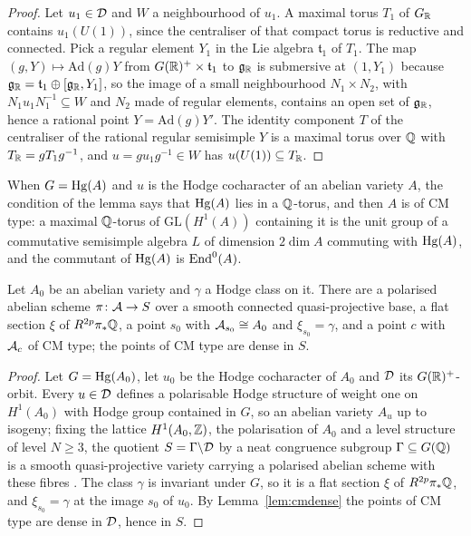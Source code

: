 \begin{proof}
Let $u_{1}\in\mathcal{D}$ and $W$ a neighbourhood of $u_{1}$. A maximal torus $T_{1}$ of $G_{\mathbb{R}}$ contains $u_{1}(U(1))$, since the centraliser of that compact torus is reductive and connected. Pick a regular element $Y_{1}$ in the Lie algebra $\mathfrak{t}_{1}$ of $T_{1}$. The map $(g,Y)\mapsto\mathrm{Ad}(g)Y$ from $G(\mathbb{R})^{+}\times\mathfrak{t}_{1}$ to $\mathfrak{g}_{\mathbb{R}}$ is submersive at $(1,Y_{1})$ because $\mathfrak{g}_{\mathbb{R}}=\mathfrak{t}_{1}\oplus[\mathfrak{g}_{\mathbb{R}},Y_{1}]$, so the image of a small neighbourhood $N_{1}\times N_{2}$, with $N_{1}u_{1}N_{1}^{-1}\subseteq W$ and $N_{2}$ made of regular elements, contains an open set of $\mathfrak{g}_{\mathbb{R}}$, hence a rational point $Y=\mathrm{Ad}(g)Y'$. The identity component $T$ of the centraliser of the rational regular semisimple $Y$ is a maximal torus over $\mathbb{Q}$ with $T_{\mathbb{R}}=gT_{1}g^{-1}$, and $u=gu_{1}g^{-1}\in W$ has $u(U(1))\subseteq T_{\mathbb{R}}$.
\end{proof}

When $G=\mathrm{Hg}(A)$ and $u$ is the Hodge cocharacter of an abelian variety $A$, the condition of the lemma says that $\mathrm{Hg}(A)$ lies in a $\mathbb{Q}$-torus, and then $A$ is of CM type: a maximal $\mathbb{Q}$-torus of $\mathrm{GL}(H^{1}(A))$ containing it is the unit group of a commutative semisimple algebra $L$ of dimension $2\dim A$ commuting with $\mathrm{Hg}(A)$, and the commutant of $\mathrm{Hg}(A)$ is $\mathrm{End}^{0}(A)$.

\begin{proposition}\label{prop:cmfamily}
Let $A_{0}$ be an abelian variety and $\gamma$ a Hodge class on it. There are a polarised abelian scheme $\pi\colon\mathcal{A}\to S$ over a smooth connected quasi-projective base, a flat section $\xi$ of $R^{2p}\pi_{*}\mathbb{Q}$, a point $s_{0}$ with $\mathcal{A}_{s_{0}}\cong A_{0}$ and $\xi_{s_{0}}=\gamma$, and a point $c$ with $\mathcal{A}_{c}$ of CM type; the points of CM type are dense in $S$.
\end{proposition}

\begin{proof}
Let $G=\mathrm{Hg}(A_{0})$, let $u_{0}$ be the Hodge cocharacter of $A_{0}$ and $\mathcal{D}$ its $G(\mathbb{R})^{+}$-orbit. Every $u\in\mathcal{D}$ defines a polarisable Hodge structure of weight one on $H^{1}(A_{0})$ with Hodge group contained in $G$, so an abelian variety $A_{u}$ up to isogeny; fixing the lattice $H^{1}(A_{0},\mathbb{Z})$, the polarisation of $A_{0}$ and a level structure of level $N\ge3$, the quotient $S=\Gamma\backslash\mathcal{D}$ by a neat congruence subgroup $\Gamma\subseteq G(\mathbb{Q})$ is a smooth quasi-projective variety carrying a polarised abelian scheme with these fibres \cite{Mum69,Del71}. The class $\gamma$ is invariant under $G$, so it is a flat section $\xi$ of $R^{2p}\pi_{*}\mathbb{Q}$, and $\xi_{s_{0}}=\gamma$ at the image $s_{0}$ of $u_{0}$. By Lemma~\ref{lem:cmdense} the points of CM type are dense in $\mathcal{D}$, hence in $S$.
\end{proof}

